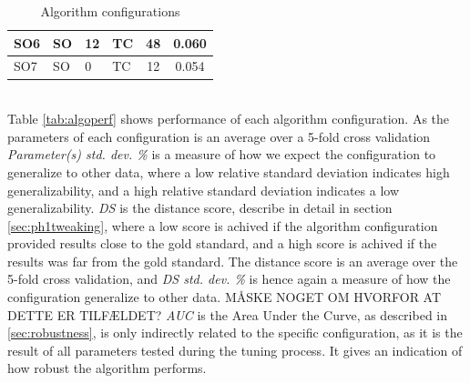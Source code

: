 \begin{table}[!ht]
\begin{tabular}{| l | l | p{2cm} | p{2cm} | c | c | }
    SO6 & SO & 12 & TC & 48 & 0.060 \\\hline
    SO7 & SO & 0 & TC & 12 & 0.054 \\\hline%
%
%
  \end{tabular}
\caption{Algorithm configurations}
\label{tab:algoconfigs}
\end{table}\\
%
Table \ref{tab:algoperf} shows performance of each algorithm configuration. As the parameters of each configuration is an average over a 5-fold cross validation \textit{Parameter(s) std. dev. \%} is a measure of how we expect the configuration to generalize to other data, where a low relative standard deviation indicates high generalizability, and a high relative standard deviation indicates a low generalizability. \textit{DS} is the distance score, describe in detail in section \ref{sec:ph1tweaking}, where a low score is achived if the algorithm configuration provided results close to the gold standard, and a high score is achived if the results was far from the gold standard. The distance score is an average over the 5-fold cross validation, and \textit{DS std. dev. \%} is hence again a measure of how the configuration generalize to other data. MÅSKE NOGET OM HVORFOR AT DETTE ER TILFÆLDET? \textit{AUC} is the Area Under the Curve, as described in \ref{sec:robustness}, is only indirectly related to the specific configuration, as it is the result of all parameters tested during the tuning process. It gives an indication of how robust the algorithm performs.
